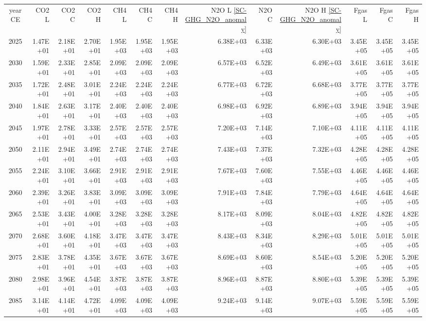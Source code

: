 \documentclass{article}
\begin{document}
\begin{table}
\begin{tabular}{crrr|rrr|rrr|rrr}
year CE  & CO2 L    & CO2 C    & CO2 H    & CH4 L    & CH4 C    & CH4 H    & N2O L \ref{SC-GHG_N2O_anomaly}     & N2O C      & N2O H \ref{SC-GHG_N2O_anomaly}    & Fgas L   & Fgas C   & Fgas H   \\
2025     & 1.47E+01 & 2.18E+01 & 2.70E+01 & 1.95E+03 & 1.95E+03 & 1.95E+03 & 6.38E+03 & 6.33E+03 & 6.30E+03 & 3.45E+05 & 3.45E+05 & 3.45E+05 \\
2030     & 1.59E+01 & 2.33E+01 & 2.85E+01 & 2.09E+03 & 2.09E+03 & 2.09E+03 & 6.57E+03 & 6.52E+03 & 6.49E+03 & 3.61E+05 & 3.61E+05 & 3.61E+05 \\
2035     & 1.72E+01 & 2.48E+01 & 3.01E+01 & 2.24E+03 & 2.24E+03 & 2.24E+03 & 6.77E+03 & 6.72E+03 & 6.68E+03 & 3.77E+05 & 3.77E+05 & 3.77E+05 \\
2040     & 1.84E+01 & 2.63E+01 & 3.17E+01 & 2.40E+03 & 2.40E+03 & 2.40E+03 & 6.98E+03 & 6.92E+03 & 6.89E+03 & 3.94E+05 & 3.94E+05 & 3.94E+05 \\
2045     & 1.97E+01 & 2.78E+01 & 3.33E+01 & 2.57E+03 & 2.57E+03 & 2.57E+03 & 7.20E+03 & 7.14E+03 & 7.10E+03 & 4.11E+05 & 4.11E+05 & 4.11E+05 \\
2050     & 2.11E+01 & 2.94E+01 & 3.49E+01 & 2.74E+03 & 2.74E+03 & 2.74E+03 & 7.43E+03 & 7.37E+03 & 7.32E+03 & 4.28E+05 & 4.28E+05 & 4.28E+05 \\
2055     & 2.24E+01 & 3.10E+01 & 3.66E+01 & 2.91E+03 & 2.91E+03 & 2.91E+03 & 7.67E+03 & 7.60E+03 & 7.55E+03 & 4.46E+05 & 4.46E+05 & 4.46E+05 \\
2060     & 2.39E+01 & 3.26E+01 & 3.83E+01 & 3.09E+03 & 3.09E+03 & 3.09E+03 & 7.91E+03 & 7.84E+03 & 7.79E+03 & 4.64E+05 & 4.64E+05 & 4.64E+05 \\
2065     & 2.53E+01 & 3.43E+01 & 4.00E+01 & 3.28E+03 & 3.28E+03 & 3.28E+03 & 8.17E+03 & 8.09E+03 & 8.04E+03 & 4.82E+05 & 4.82E+05 & 4.82E+05 \\
2070     & 2.68E+01 & 3.60E+01 & 4.18E+01 & 3.47E+03 & 3.47E+03 & 3.47E+03 & 8.43E+03 & 8.34E+03 & 8.29E+03 & 5.01E+05 & 5.01E+05 & 5.01E+05 \\
2075     & 2.83E+01 & 3.78E+01 & 4.35E+01 & 3.67E+03 & 3.67E+03 & 3.67E+03 & 8.69E+03 & 8.60E+03 & 8.54E+03 & 5.20E+05 & 5.20E+05 & 5.20E+05 \\
2080     & 2.98E+01 & 3.96E+01 & 4.54E+01 & 3.87E+03 & 3.87E+03 & 3.87E+03 & 8.96E+03 & 8.87E+03 & 8.80E+03 & 5.39E+05 & 5.39E+05 & 5.39E+05 \\
2085     & 3.14E+01 & 4.14E+01 & 4.72E+01 & 4.09E+03 & 4.09E+03 & 4.09E+03 & 9.24E+03 & 9.14E+03 & 9.07E+03 & 5.59E+05 & 5.59E+05 & 5.59E+05 \\

\end{tabular}
\end{table}
\end{document}
